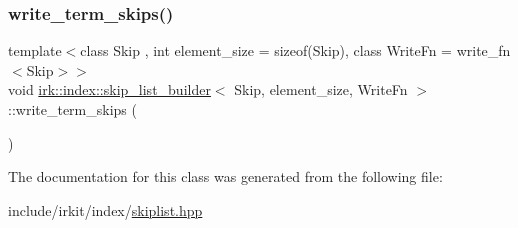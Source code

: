 \mbox{\label{classirk_1_1index_1_1skip__list__builder_ae3526c260650dda4bd771087927fe871}} 
\subsubsection{\texorpdfstring{write\+\_\+term\+\_\+skips()}{write\_term\_skips()}}
{\footnotesize\ttfamily template$<$class Skip , int element\+\_\+size = sizeof(\+Skip), class Write\+Fn  = write\+\_\+fn$<$\+Skip$>$$>$ \\
void \mbox{\hyperlink{classirk_1_1index_1_1skip__list__builder}{irk\+::index\+::skip\+\_\+list\+\_\+builder}}$<$ Skip, element\+\_\+size, Write\+Fn $>$\+::write\+\_\+term\+\_\+skips (\begin{DoxyParamCaption}{ }\end{DoxyParamCaption})\hspace{0.3cm}{\ttfamily [inline]}}



The documentation for this class was generated from the following file\+:\begin{DoxyCompactItemize}
\item 
include/irkit/index/\mbox{\hyperlink{skiplist_8hpp}{skiplist.\+hpp}}\end{DoxyCompactItemize}
